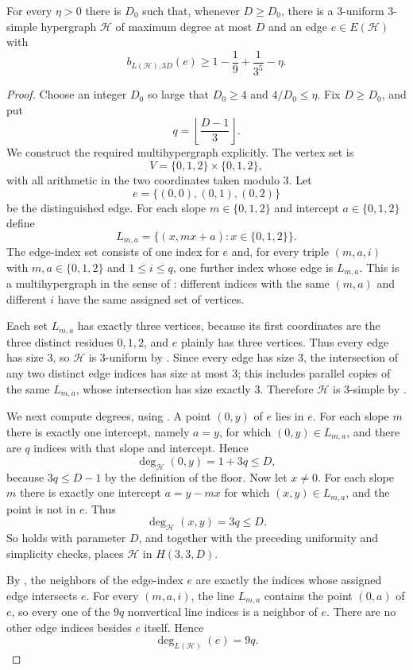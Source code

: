 \begin{lemma}
For every $\eta>0$ there is $D_0$ such that, whenever $D\ge D_0$, there is a
$3$-uniform $3$-simple hypergraph $\mathcal H$ of maximum degree at most $D$
and an edge $e\in E(\mathcal H)$ with
\[
b_{L(\mathcal H),3D}(e)\ge
1-\frac19+\frac1{3^5}-\eta .
\]
\end{lemma}
\begin{proof}
Choose an integer $D_0$ so large that $D_0\ge 4$ and
$4/D_0\le \eta$.  Fix $D\ge D_0$, and put
\[
q=\left\lfloor\frac{D-1}{3}\right\rfloor .
\]
We construct the required multihypergraph explicitly.  The vertex set is
\[
V=\{0,1,2\}\times\{0,1,2\},
\]
with all arithmetic in the two coordinates taken modulo $3$.  Let
\[
e=\{(0,0),(0,1),(0,2)\}
\]
be the distinguished edge.  For each slope $m\in\{0,1,2\}$ and intercept
$a\in\{0,1,2\}$ define
\[
L_{m,a}=\{(x,mx+a):x\in\{0,1,2\}\}.
\]
The edge-index set consists of one index for $e$ and, for every triple
$(m,a,i)$ with $m,a\in\{0,1,2\}$ and $1\le i\le q$, one further index whose
edge is $L_{m,a}$.  This is a multihypergraph in the sense of
: different indices with the same $(m,a)$ and
different $i$ have the same assigned set of vertices.

Each set $L_{m,a}$ has exactly three vertices, because its first coordinates
are the three distinct residues $0,1,2$, and $e$ plainly has three vertices.
Thus every edge has size $3$, so $\mathcal H$ is $3$-uniform by
.  Since every edge has size $3$, the intersection
of any two distinct edge indices has size at most $3$; this includes parallel
copies of the same $L_{m,a}$, whose intersection has size exactly $3$.
Therefore $\mathcal H$ is $3$-simple by .

We next compute degrees, using .  A point
$(0,y)$ of $e$ lies in $e$.  For each slope $m$ there is exactly one intercept,
namely $a=y$, for which $(0,y)\in L_{m,a}$, and there are $q$ indices with
that slope and intercept.  Hence
\[
\deg_{\mathcal H}(0,y)=1+3q\le D,
\]
because $3q\le D-1$ by the definition of the floor.  Now let $x\ne 0$.
For each slope $m$ there is exactly one intercept $a=y-mx$ for which
$(x,y)\in L_{m,a}$, and the point is not in $e$.  Thus
\[
\deg_{\mathcal H}(x,y)=3q\le D.
\]
So  holds with parameter $D$, and together with
the preceding uniformity and simplicity checks, 
places $\mathcal H$ in $H(3,3,D)$.

By , the neighbors of the edge-index $e$ are
exactly the indices whose assigned edge intersects $e$.  For every
$(m,a,i)$, the line $L_{m,a}$ contains the point $(0,a)$ of $e$, so every one
of the $9q$ nonvertical line indices is a neighbor of $e$.  There are no other
edge indices besides $e$ itself.  Hence
\[
\deg_{L(\mathcal H)}(e)=9q.
\]


\end{proof}
